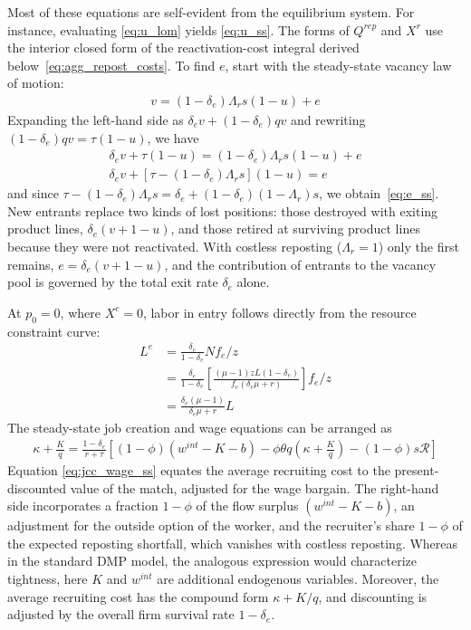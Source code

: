 \documentclass[authoryear, review, 12pt]{elsarticle}
\begin{document}
	Most of these equations are self-evident from the equilibrium system. For instance, evaluating \eqref{eq:u_lom} yields \eqref{eq:u_ss}. The forms of $Q^{rep}$ and $X^r$ use the interior closed form of the reactivation-cost integral derived below~\eqref{eq:agg_repost_costs}. To find $e$, start with the steady-state vacancy law of motion:
	\begin{align}
		[1-(1-\delta_e)(1-q)]v=(1-\delta_e)\Lambda_r s(1-u)+e
	\end{align}
	Expanding the left-hand side as $\delta_e v+(1-\delta_e)qv$ and rewriting $(1-\delta_e)qv=\tau(1-u)$, we have
	\begin{align}
		\delta_e v+\tau(1-u)=(1-\delta_e)\Lambda_r s(1-u)+e\\
		\delta_e v + [\tau-(1-\delta_e)\Lambda_r s](1-u)=e
	\end{align}
	and since $\tau-(1-\delta_e)\Lambda_r s=\delta_e+(1-\delta_e)(1-\Lambda_r)s$, we obtain~\eqref{eq:e_ss}. New entrants replace two kinds of lost positions: those destroyed with exiting product lines, $\delta_e(v+1-u)$, and those retired at surviving product lines because they were not reactivated. With costless reposting ($\Lambda_r=1$) only the first remains, $e=\delta_e(v+1-u)$, and the contribution of entrants to the vacancy pool is governed by the total exit rate $\delta_e$ alone.
	
	At $p_0=0$, where $X^c=0$, labor in entry follows directly from the resource constraint curve:
	\begin{align}
		L^e&=\frac{\delta_e}{1-\delta_e}Nf_e/z\\
		&=\frac{\delta_e}{1-\delta_e}\left[\frac{(\mu-1)zL(1-\delta_e)}{f_e(\delta_e \mu+r)}\right]f_e/z\\
		&=\frac{\delta_e(\mu-1)}{\delta_e \mu+r}L
	\end{align}
	The steady-state job creation and wage equations can be arranged as
	\begin{align}\label{eq:jcc_wage_ss}
		\kappa+\frac{K}{q}=\frac{1-\delta_e}{r+\tau}\left[(1-\phi)(w^{int}-K-b)-\phi \theta q\!\left(\kappa+\frac{K}{q}\right)-(1-\phi)s\mathcal{R}\right]
	\end{align}
	Equation \eqref{eq:jcc_wage_ss} equates the average recruiting cost to the present-discounted value of the match, adjusted for the wage bargain. The right-hand side incorporates a fraction $1-\phi$ of the flow surplus $(w^{int}-K-b)$, an adjustment for the outside option of the worker, and the recruiter's share $1-\phi$ of the expected reposting shortfall, which vanishes with costless reposting. Whereas in the standard DMP model, the analogous expression would characterize tightness, here $K$ and $w^{int}$ are additional endogenous variables. Moreover, the average recruiting cost has the compound form $\kappa+K/q$, and discounting is adjusted by the overall firm survival rate $1-\delta_e$.
	
\end{document}
